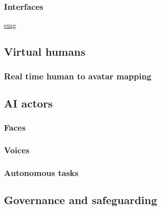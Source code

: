 \subsubsection{Interfaces}
\href{https://tech.fb.com/ar-vr/2021/03/inside-facebook-reality-labs-wrist-based-interaction-for-the-next-computing-platform/}{emg}
\subsection{Virtual humans}
\subsubsection{Real time human to avatar mapping}
\subsection{AI actors}
\subsubsection{Faces}
\subsubsection{Voices}
\subsubsection{Autonomous tasks}
\subsection{Governance and safeguarding}


